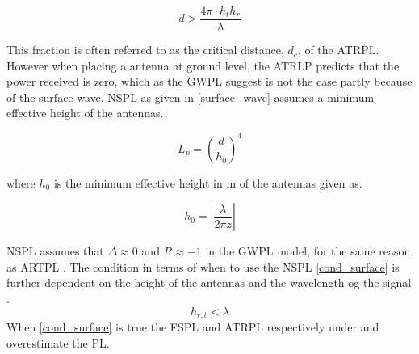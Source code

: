 \begin{equation}
d > \frac{4\pi \cdot h_t h_r }{\lambda}
\label{two_ray_cond}
\end{equation}

This fraction is often referred to as the critical distance, $d_c$, of the ATRPL. However when placing a antenna at ground level, the ATRLP predicts that the power received is zero, which as the GWPL suggest is not the case partly because of the surface wave. NSPL as given in \eqref{surface_wave} assumes a minimum effective height of the antennas. 

\begin{equation}
L_p=\left(\frac{d}{h_{0}}\right)^4
\label{surface_wave}
\end{equation}

where $h_0$ is the minimum effective height in m of the antennas given as. 

\begin{equation}
h_{0} = \left|\frac{\lambda}{2\pi z}\right|
\label{h_0}
\end{equation}

NSPL assumes that $\Delta \approx 0$ and $R\approx -1$ in the GWPL model, for the same reason as ARTPL \cite{Chong}. The condition in terms of when to use the NSPL \eqref{cond_surface} is further dependent on the height of the antennas and the wavelength og the signal \cite{Chong}.
\begin{equation}
h_{r,t} < \lambda
\label{cond_surface}
\end{equation}
When \eqref{cond_surface} is true the FSPL and ATRPL respectively under and overestimate the PL.
